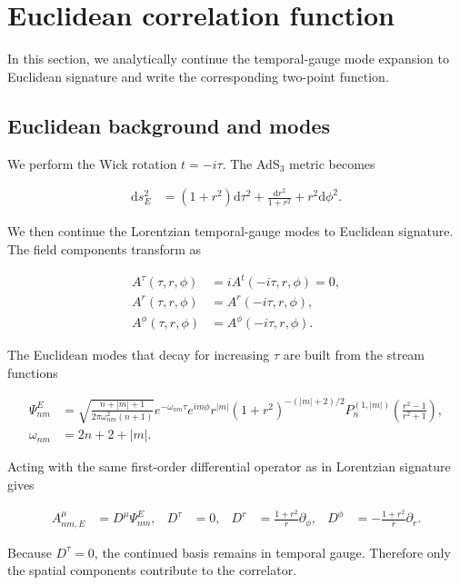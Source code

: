 \section{Euclidean correlation function}\label{sec:euclidean-correlation-function}

In this section, we analytically continue the temporal-gauge mode expansion to Euclidean signature and write the corresponding two-point function.

\subsection{Euclidean background and modes}\label{subsec:euclidean-temporal-gauge-modes}

We perform the Wick rotation $t=-i\tau$. The AdS$_3$ metric becomes

\begin{align}
\mathrm{d}s_{E}^{2}&=(1+r^{2})\mathrm{d}\tau^{2}+\frac{\mathrm{d}r^{2}}{1+r^{2}}+r^{2}\mathrm{d}\phi^{2}.
\end{align}

We then continue the Lorentzian temporal-gauge modes to Euclidean signature. The field components transform as

\begin{align}
A^{\tau}(\tau,r,\phi)&=iA^{t}(-i\tau,r,\phi)=0, \\
A^{r}(\tau,r,\phi)&=A^{r}(-i\tau,r,\phi), \\
A^{\phi}(\tau,r,\phi)&=A^{\phi}(-i\tau,r,\phi).
\end{align}

The Euclidean modes that decay for increasing $\tau$ are built from the stream functions

\begin{align}
\Psi_{nm}^{E}&=\sqrt{\frac{n+|m|+1}{2\pi\omega_{nm}^{2}(n+1)}}e^{-\omega_{nm}\tau}e^{im\phi}r^{|m|}(1+r^{2})^{-(|m|+2)/2}P_{n}^{(1,|m|)}\left(\frac{r^{2}-1}{r^{2}+1}\right), \\
\omega_{nm}&=2n+2+|m|.
\end{align}

Acting with the same first-order differential operator as in Lorentzian signature gives

\begin{align}
A_{nm,E}^{\mu}&=D^{\mu}\Psi_{nm}^{E}, &
D^{\tau}&=0, &
D^{r}&=\frac{1+r^{2}}{r}\partial_{\phi}, &
D^{\phi}&=-\frac{1+r^{2}}{r}\partial_{r}.
\end{align}

Because $D^{\tau}=0$, the continued basis remains in temporal gauge. Therefore only the spatial components contribute to the correlator.


